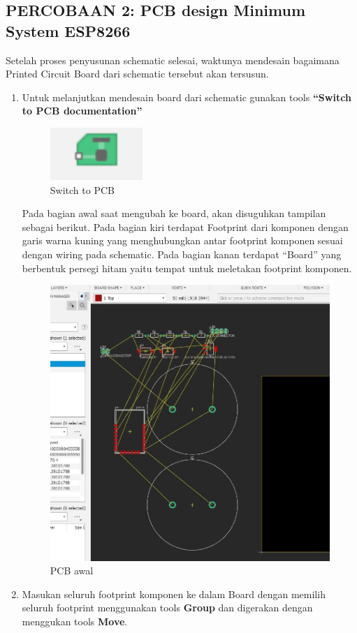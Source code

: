 \begin{enumerate}
\section*{PERCOBAAN 2: PCB design Minimum System ESP8266}
Setelah proses penyusunan schematic selesai, waktunya mendesain bagaimana Printed Circuit Board
dari schematic tersebut akan tersusun.
\begin{enumerate}
    \item Untuk melanjutkan mendesain board dari schematic gunakan tools \textbf{“Switch to PCB
    documentation”}
    \begin{figure}[H]
        \centering
        \includegraphics[width=0.4\linewidth]{P1/img/switchtopcb.png}
        \caption{Switch to PCB} 
        \label{fig:Switch to PCB}
    \end{figure}
    Pada bagian awal saat mengubah ke board, akan disuguhkan tampilan sebagai berikut. Pada
bagian kiri terdapat Footprint dari komponen dengan garis warna kuning yang
menghubungkan antar footprint komponen sesuai dengan wiring pada schematic. Pada
bagian kanan terdapat “Board” yang berbentuk persegi hitam yaitu tempat untuk meletakan
footprint komponen.
    \begin{figure}[H]
        \centering
        \includegraphics[width=0.6\linewidth]{P1/img/gambar24.jpeg}
        \caption{PCB awal} 
        \label{fig:PCB awal}
    \end{figure}
    \item Masukan seluruh footprint komponen ke dalam Board dengan memilih seluruh footprint menggunakan tools \textbf{Group} dan digerakan dengan menggukan tools \textbf{Move}.

\end{enumerate}
\end{enumerate}
